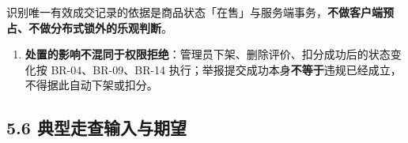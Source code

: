 \documentclass[12pt,a4paper]{ctexart}
\begin{document}
识别唯一有效成交记录的依据是商品状态「在售」与服务端事务，\textbf{不做客户端预占、不做分布式锁外的乐观判断}。

\begin{enumerate}[leftmargin=1.9em,itemsep=1pt,topsep=2pt]
\item \textbf{处置的影响不混同于权限拒绝}：管理员下架、删除评价、扣分成功后的状态变化按 BR-04、BR-09、BR-14 执行；举报提交成功本身\textbf{不等于}违规已经成立，不得据此自动下架或扣分。
\end{enumerate}

\subsection*{5.6 典型走查输入与期望}
\end{document}
